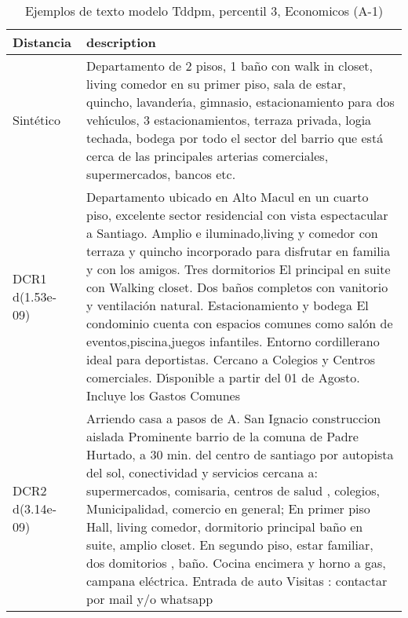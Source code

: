\begin{table}[H]
\centering
\fontsize{10}{14}\selectfont
\caption{Ejemplos de texto modelo Tddpm, percentil 3, Economicos (A-1)}
\label{table-example-economicos-a-1-tddpm_mlp-3p-text}
\begin{tabular}{|l|m{35em}|}
\hline
\rowcolor[gray]{0.8}
Distancia & description \\
\hline Sintético & Departamento de 2 pisos, 1 ba\~no con walk in closet, living comedor en su primer piso, sala de estar, quincho, lavander{\'\i}a, gimnasio, estacionamiento para dos veh{\'\i}culos, 3 estacionamientos, terraza privada, logia techada, bodega por todo el sector del barrio que est\'a cerca de las principales arterias comerciales, supermercados, bancos etc. \\
\hline DCR1 d(1.53e-09) & Departamento ubicado en Alto Macul en un cuarto piso, excelente sector residencial con vista espectacular a Santiago.
Amplio e iluminado,living y comedor con terraza y quincho incorporado para disfrutar en familia y con los amigos.
Tres dormitorios El principal en suite con Walking closet.
Dos ba\~nos completos con vanitorio y ventilaci\'on natural.
Estacionamiento y bodega
El condominio cuenta con espacios comunes como sal\'on de eventos,piscina,juegos infantiles.
Entorno cordillerano ideal para deportistas.
Cercano a Colegios y Centros comerciales.
D{\'\i}sponible a partir del 01 de Agosto.
Incluye los Gastos Comunes \\
\hline DCR2 d(3.14e-09) & Arriendo casa a pasos de A. San Ignacio construccion aislada Prominente barrio de la comuna de Padre Hurtado, a 30 min. del centro de santiago por autopista del sol, conectividad y servicios cercana a: supermercados, comisaria, centros de salud , colegios, Municipalidad, comercio en general; En primer piso Hall, living comedor, dormitorio principal ba\~no en suite, amplio closet. En segundo piso, estar familiar, dos domitorios , ba\~no. Cocina encimera y horno a gas, campana el\'ectrica. Entrada de auto Visitas : contactar por mail y/o whatsapp \\
\hline
\end{tabular}
\end{table}
